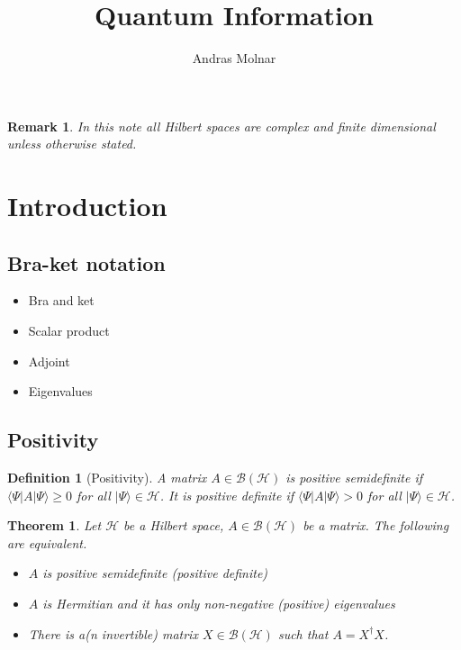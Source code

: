 \documentclass{article}
\title{Quantum Information}
\author{Andras Molnar}
\newtheorem{theorem}{Theorem}
\newtheorem{remark}{Remark}
\newtheorem{definition}{Definition}
\theoremstyle{definition}
\newcommand{\ket}[1]{\vert #1 \rangle}
\newcommand{\bra}[1]{\langle #1 \vert}
\newcommand{\bounded}[1]{\mathcal{B}(#1)}
\begin{document}
\maketitle

\begin{remark}
  In this note all Hilbert spaces are complex and finite dimensional unless otherwise stated.
\end{remark}


\section{Introduction}

\subsection{Bra-ket notation}

\begin{itemize}
  \item Bra and ket
  \item Scalar product
  \item Adjoint
  \item Eigenvalues
\end{itemize}

\subsection{Positivity}

\begin{definition}[Positivity]
  A matrix $A\in \bounded{\mathcal{H}}$ is \emph{positive semidefinite} if $\bra{\Psi} A\ket{\Psi} \geq 0$ for all $\ket{\Psi}\in\mathcal{H}$. It is \emph{positive definite} if $\bra{\Psi} A\ket{\Psi} > 0$ for all $\ket{\Psi}\in\mathcal{H}$. 
\end{definition}

\begin{theorem}
  Let $\mathcal{H}$ be a Hilbert space, $A\in\bounded{\mathcal{H}}$ be a matrix. The following are equivalent.
  \begin{itemize}
    \item $A$ is positive semidefinite (positive definite)
    \item $A$ is Hermitian and it has only non-negative (positive) eigenvalues
    \item There is a(n invertible) matrix $X\in \bounded{\mathcal{H}}$ such that $A = X^\dagger X$.
  \end{itemize}
\end{theorem}
\end{document}
